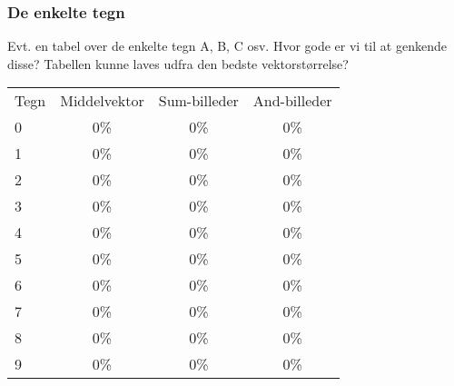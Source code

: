 \subsubsection*{De enkelte tegn}

Evt. en tabel over de enkelte tegn A, B, C osv. Hvor gode er vi til at genkende disse? Tabellen kunne laves udfra den bedste vektorstørrelse?


\begin{tabular}{|l|c|c|c|}\hline
\rowcolor[gray]{0.9} \multicolumn{4}{|>{\columncolor[gray]{0.9}}c|}{\textbf{Træningssæt}} \\ \hline
Tegn & Middelvektor & Sum-billeder & And-billeder\\\hline
0 & 0\% & 0\% & 0\%\\\hline
1 & 0\%  & 0\% & 0\%\\\hline
2 & 0\% & 0\% & 0\%\\\hline
3 & 0\% & 0\% & 0\%\\\hline
4 & 0\% & 0\% & 0\%\\\hline
5 & 0\% & 0\% & 0\%\\\hline
6 & 0\% & 0\% & 0\%\\\hline
7 & 0\% & 0\% & 0\%\\\hline
8 & 0\% & 0\% & 0\%\\\hline
9 & 0\% & 0\% & 0\%\\\hline
\end{tabular}

